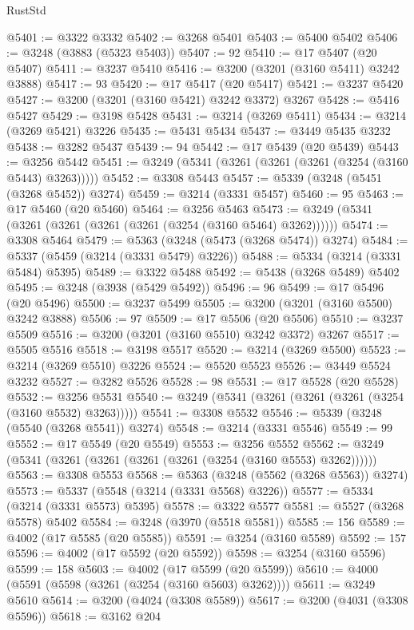 \begin{lexlean}{RustStd}
\begin{coremodule}
@5401 := @3322 @3332
@5402 := @3268 @5401
@5403 := @5400 @5402
@5406 := @3248 (@3883 (@5323 @5403))
@5407 := 92
@5410 := @17 @5407 (@20 @5407)
@5411 := @3237 @5410
@5416 := @3200 (@3201 (@3160 @5411) @3242 @3888)
@5417 := 93
@5420 := @17 @5417 (@20 @5417)
@5421 := @3237 @5420
@5427 := @3200 (@3201 (@3160 @5421) @3242 @3372) @3267
@5428 := @5416 @5427
@5429 := @3198 @5428
@5431 := @3214 (@3269 @5411)
@5434 := @3214 (@3269 @5421) @3226
@5435 := @5431 @5434
@5437 := @3449 @5435 @3232
@5438 := @3282 @5437
@5439 := 94
@5442 := @17 @5439 (@20 @5439)
@5443 := @3256 @5442
@5451 := @3249 (@5341 (@3261 (@3261 (@3261 (@3254 (@3160 @5443) @3263)))))
@5452 := @3308 @5443
@5457 := @5339 (@3248 (@5451 (@3268 @5452)) @3274)
@5459 := @3214 (@3331 @5457)
@5460 := 95
@5463 := @17 @5460 (@20 @5460)
@5464 := @3256 @5463
@5473 := @3249 (@5341 (@3261 (@3261 (@3261 (@3261 (@3254 (@3160 @5464) @3262))))))
@5474 := @3308 @5464
@5479 := @5363 (@3248 (@5473 (@3268 @5474)) @3274)
@5484 := @5337 (@5459 (@3214 (@3331 @5479) @3226))
@5488 := @5334 (@3214 (@3331 @5484) @5395)
@5489 := @3322 @5488
@5492 := @5438 (@3268 @5489) @5402
@5495 := @3248 (@3938 (@5429 @5492))
@5496 := 96
@5499 := @17 @5496 (@20 @5496)
@5500 := @3237 @5499
@5505 := @3200 (@3201 (@3160 @5500) @3242 @3888)
@5506 := 97
@5509 := @17 @5506 (@20 @5506)
@5510 := @3237 @5509
@5516 := @3200 (@3201 (@3160 @5510) @3242 @3372) @3267
@5517 := @5505 @5516
@5518 := @3198 @5517
@5520 := @3214 (@3269 @5500)
@5523 := @3214 (@3269 @5510) @3226
@5524 := @5520 @5523
@5526 := @3449 @5524 @3232
@5527 := @3282 @5526
@5528 := 98
@5531 := @17 @5528 (@20 @5528)
@5532 := @3256 @5531
@5540 := @3249 (@5341 (@3261 (@3261 (@3261 (@3254 (@3160 @5532) @3263)))))
@5541 := @3308 @5532
@5546 := @5339 (@3248 (@5540 (@3268 @5541)) @3274)
@5548 := @3214 (@3331 @5546)
@5549 := 99
@5552 := @17 @5549 (@20 @5549)
@5553 := @3256 @5552
@5562 := @3249 (@5341 (@3261 (@3261 (@3261 (@3261 (@3254 (@3160 @5553) @3262))))))
@5563 := @3308 @5553
@5568 := @5363 (@3248 (@5562 (@3268 @5563)) @3274)
@5573 := @5337 (@5548 (@3214 (@3331 @5568) @3226))
@5577 := @5334 (@3214 (@3331 @5573) @5395)
@5578 := @3322 @5577
@5581 := @5527 (@3268 @5578) @5402
@5584 := @3248 (@3970 (@5518 @5581))
@5585 := 156
@5589 := @4002 (@17 @5585 (@20 @5585))
@5591 := @3254 (@3160 @5589)
@5592 := 157
@5596 := @4002 (@17 @5592 (@20 @5592))
@5598 := @3254 (@3160 @5596)
@5599 := 158
@5603 := @4002 (@17 @5599 (@20 @5599))
@5610 := @4000 (@5591 (@5598 (@3261 (@3254 (@3160 @5603) @3262))))
@5611 := @3249 @5610
@5614 := @3200 (@4024 (@3308 @5589))
@5617 := @3200 (@4031 (@3308 @5596))
@5618 := @3162 @204

\end{coremodule}
\end{lexlean}
